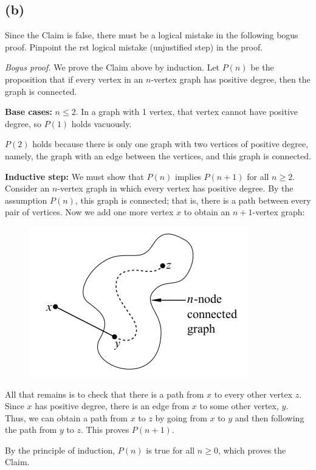 \documentclass[14pt]{extarticle}
\begin{document}
\subsection{(b)}
Since the Claim is false, there must be a logical mistake in the following bogus proof. Pinpoint the rst logical mistake (unjustified step) in the proof.

{\it Bogus proof.} We prove the Claim above by induction. Let $P(n)$ be the proposition that if every vertex in an $n$-vertex graph has positive degree, then the graph is connected.

{\bf Base cases:} $n \leq 2$. In a graph with 1 vertex, that vertex cannot have positive degree, so $P(1)$ holds vacuously.

$P(2)$ holds because there is only one graph with two vertices of positive degree, namely, the graph with an edge between the vertices, and this graph is connected.

{\bf Inductive step:} We must show that $P(n)$ implies $P(n + 1)$ for all $n \geq 2$. Consider an $n$-vertex graph in which every vertex has positive degree. By the assumption $P(n)$, this graph is connected; that is, there is a path between every pair of vertices. Now we add one more vertex $x$ to obtain an $n + 1$-vertex graph:

\begin{figure}[ht!]
\centering
\includegraphics[scale=0.5]{n-node.png}
\end{figure}

All that remains is to check that there is a path from $x$ to every other vertex $z$. Since $x$ has positive degree, there is an edge from $x$ to some other vertex, $y$. Thus, we can obtain a path from $x$ to $z$ by going from $x$ to $y$ and then following the path from $y$ to $z$. This proves $P(n+1)$.

By the principle of induction, $P(n)$ is true for all $n \geq 0$, which proves the Claim.
\end{document}

